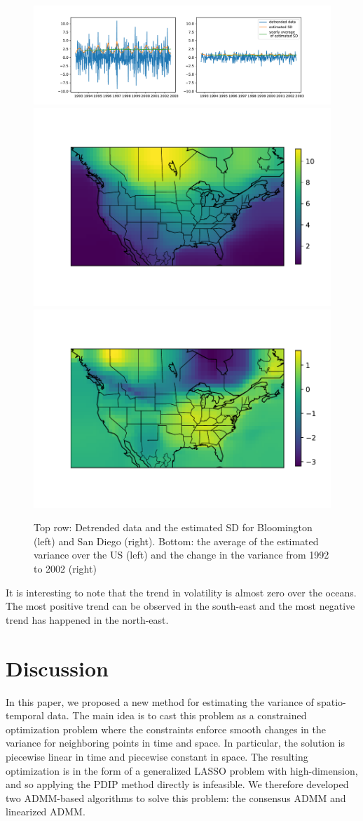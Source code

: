 \documentclass{article}
\begin{document}
\begin{figure}[tb]
	  \centering
          \includegraphics[width=.9\columnwidth]{Figures/estimatedSD}\\
	  \includegraphics[width=.45\linewidth]{Figures/avg_estimatedVar}
	  \includegraphics[width=.45\linewidth]{Figures/avg_change_estimatedVar}
	\caption{Top row: Detrended data and the estimated SD for Bloomington (left) and San Diego (right). Bottom: the average of the estimated variance over the US (left) and the change in the variance from 1992 to 2002 (right)}
	\label{fig:avg_change_estimatedSD}
\end{figure} 
It is interesting to note that the trend in volatility is almost zero over the oceans. The most positive trend can be observed in the south-east and the most negative trend has happened in the north-east. 
 

\section{Discussion}
In this paper, we proposed a new method for estimating the variance of spatio-temporal data. The main idea is to cast this problem as a constrained optimization problem where the constraints enforce smooth changes in the variance for neighboring points in time and space. In particular, the solution is piecewise linear in time and piecewise constant in space. The resulting optimization is in the form of a generalized LASSO problem with high-dimension, and so applying the PDIP method directly is infeasible. We therefore developed two ADMM-based algorithms to solve this problem: the consensus ADMM and linearized ADMM.
\end{document}
